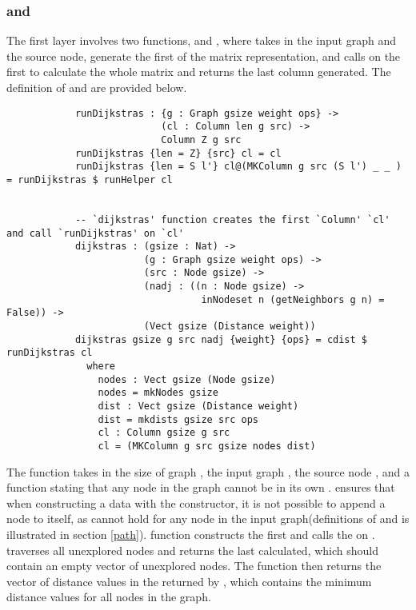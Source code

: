 \subsubsection{ and } \label{first_layer}
The first layer involves two functions,  and , where  takes in the input graph and the source node, generate the first  of the matrix representation, and calls  on the first  to calculate the whole matrix and returns the last column generated. The definition of  and  are provided below.
\begin{lstlisting}
			runDijkstras : {g : Graph gsize weight ops} ->
			               (cl : Column len g src) ->
			               Column Z g src
			runDijkstras {len = Z} {src} cl = cl
			runDijkstras {len = S l'} cl@(MKColumn g src (S l') _ _ ) = runDijkstras $ runHelper cl


			-- `dijkstras' function creates the first `Column' `cl' and call `runDijkstras' on `cl'
			dijkstras : (gsize : Nat) ->
			            (g : Graph gsize weight ops) ->
			            (src : Node gsize) ->
			            (nadj : ((n : Node gsize) -> 
			            		  inNodeset n (getNeighbors g n) = False)) ->
			            (Vect gsize (Distance weight))
			dijkstras gsize g src nadj {weight} {ops} = cdist $ runDijkstras cl
			  where
			    nodes : Vect gsize (Node gsize)
			    nodes = mkNodes gsize
			    dist : Vect gsize (Distance weight)
			    dist = mkdists gsize src ops
			    cl : Column gsize g src
			    cl = (MKColumn g src gsize nodes dist)
\end{lstlisting}

The  function takes in the size of graph , the input graph , the source node , and a function  stating that any node in the graph cannot be in its own .  ensures that when constructing a  data with the  constructor, it is not possible to append a node  to itself, as  cannot hold for any node in the input graph(definitions of  and  is illustrated in section \ref{path}).  function constructs the first   and calls the  on .  traverses all unexplored nodes and returns the last  calculated, which should contain an empty vector of unexplored nodes. The  function then returns the vector of distance values in the  returned by , which contains the minimum distance values for all nodes in the graph. 
\\

